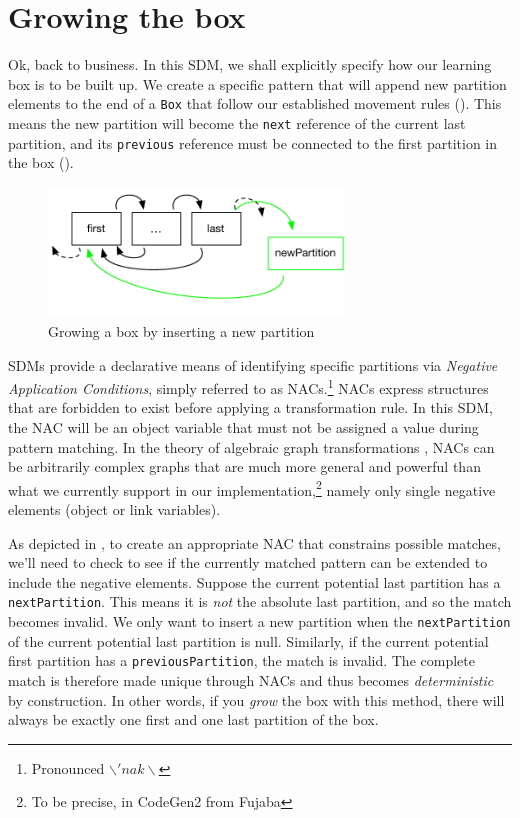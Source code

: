 \newpage
\section{Growing the box}
\genHeader

Ok, back to business. In this SDM, we shall explicitly specify how our learning box is to be built up. We create a specific pattern that will append new
partition elements to the end of a \texttt{Box} that follow our established movement rules (). This means the new partition will
become the \texttt{next} reference of the current last partition, and its \texttt{previous} reference must be connected to the first partition in the box
().

\begin{figure}[htbp]
 	\centering
  	\includegraphics[width=0.7\textwidth]{growBoxNACGoal.pdf}
	\caption{Growing a box by inserting a new partition}
	\label{fig:goal_grow}
\end{figure}
\FloatBarrier

SDMs provide a declarative means of identifying specific partitions via \emph{Negative Application Conditions}, simply referred to as
\mbox{NAC}s.\footnote{Pronounced $\backslash 'nak \backslash$} \mbox{NAC}s express structures that are forbidden to exist before applying a
transformation rule. In this SDM, the \mbox{NAC} will be an object variable that must not be assigned a value during pattern matching. In the theory of
algebraic graph transformations \cite{EEPT06}, \mbox{NACs} can be arbitrarily complex graphs that are much more general and powerful than what we currently
support in our implementation,\footnote{To be precise, in CodeGen2 from Fujaba} namely only single negative elements (object or link variables).

As depicted in , to create an appropriate \mbox{NAC} that constrains possible matches, we'll need to check to see if the currently
matched pattern can be extended to include the negative elements. Suppose the current potential last partition has a \texttt{nextPartition}. This means it
is \emph{not} the absolute last partition, and so the match becomes invalid. We only want to insert a new partition when the \texttt{nextPartition}
of the current potential last partition is null. Similarly, if the current potential first partition has a \texttt{previousPartition}, the match is invalid. The
complete match is therefore made unique through NACs and thus becomes \emph{deterministic} by construction. In other words, if you \emph{grow} the box with this method, there
will always be exactly one first and one last partition of the box.

